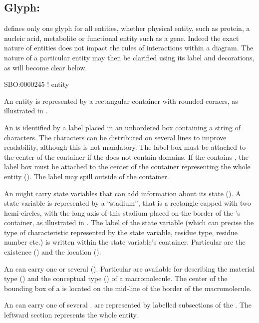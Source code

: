 \color{ForestGreen}

\subsection{Glyph: }
\label{sec:entity}

\SBGNERLone defines only one glyph for all entities, whether physical entity, such as protein, a nucleic acid, metabolite or functional entity such as a gene. Indeed the exact nature of entities does not impact the rules of interactions within a diagram. The nature of a particular entity may then be clarified using its label and decorations, as will become clear below. 

\begin{glyphDescription}

\glyphSboTerm SBO:0000245 ! entity 

\glyphContainer An entity is represented by a rectangular container with rounded corners, as illustrated in .

\glyphLabel An  is identified by a label placed in an unbordered box containing a string of characters.  The characters can be distributed on several lines to improve readability, although this is not mandatory.  The label box must be attached to the center of the container if the  does not contain domains. If the  contains , the label box must be attached to the center of the container representing the whole entity (). The label may spill outside of the container.

\glyphAux An  might carry state variables that can add information about its state ().  A state variable is represented by a ``stadium'', that is a rectangle capped with two hemi-circles, with the long axis of this stadium placed on the border of the 's container, as illustrated in .  The label of the state variable (which can precise the type of characteristic represented by the state variable, residue type, residue number etc.) is written within the state variable's container. Particular  are the existence () and the location ().

An  can carry one or several  ().  Particular  are available for describing the material type () and the conceptual type () of a macromolecule.  The center of the bounding box of a  is located on the mid-line of the border of the macromolecule.

An  can carry one of several .  are represented by labelled subsections of the . The leftward section represents the whole entity. 

\end{glyphDescription}

